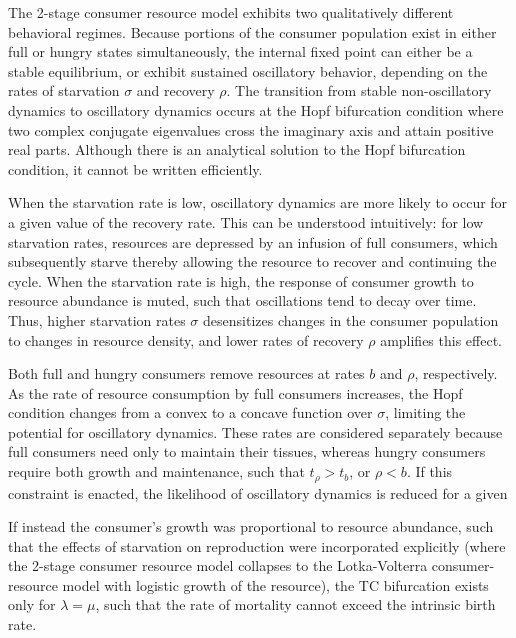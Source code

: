 \documentclass[12pt,english]{article}
\begin{document}
\begin{spacing}{1.9}
The 2-stage consumer resource model exhibits two qualitatively different behavioral regimes.
Because portions of the consumer population exist in either full or hungry states simultaneously, the internal fixed point can either be a stable equilibrium, or exhibit sustained oscillatory behavior, depending on the rates of starvation $\sigma$ and recovery $\rho$.
The transition from stable non-oscillatory dynamics to oscillatory dynamics occurs at the Hopf bifurcation condition where two complex conjugate eigenvalues cross the imaginary axis and attain positive real parts.
Although there is an analytical solution to the Hopf bifurcation condition, it cannot be written efficiently.

When the starvation rate is low, oscillatory dynamics are more likely to occur for a given value of the recovery rate.
This can be understood intuitively: for low starvation rates, resources are depressed by an infusion of full consumers, which subsequently starve thereby allowing the resource to recover and continuing the cycle.
When the starvation rate is high, the response of consumer growth to resource abundance is muted, such that oscillations tend to decay over time.
Thus, higher starvation rates $\sigma$ desensitizes changes in the consumer population to changes in resource density, and lower rates of recovery $\rho$ amplifies this effect.

Both full and hungry consumers remove resources at rates $b$ and $\rho$, respectively.
As the rate of resource consumption by full consumers increases, the Hopf condition changes from a convex to a concave function over $\sigma$, limiting the potential for oscillatory dynamics.
These rates are considered separately because full consumers need only to maintain their tissues, whereas hungry consumers require both growth and maintenance, such that $t_\rho > t_b$, or $\rho < b$.
If this constraint is enacted, the likelihood of oscillatory dynamics is reduced for a given 



If instead the consumer's growth was proportional to resource abundance, such that the effects of starvation on reproduction were incorporated explicitly (where the 2-stage consumer resource model collapses to the Lotka-Volterra consumer-resource model with logistic growth of the resource), the TC bifurcation exists only for $\lambda = \mu$, such that the rate of mortality cannot exceed the intrinsic birth rate.



\end{spacing}
\end{document}
